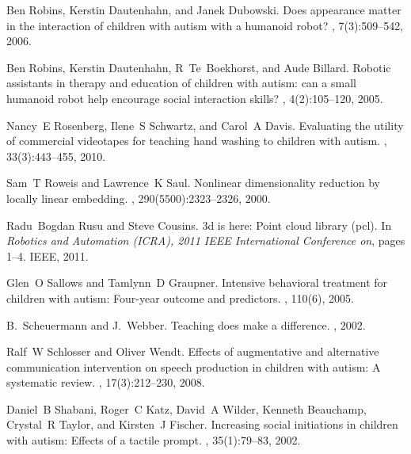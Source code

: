 \documentclass{ut-thesis}
\begin{document}
\begin{thebibliography}{100}
Ben Robins, Kerstin Dautenhahn, and Janek Dubowski.
\newblock Does appearance matter in the interaction of children with autism
  with a humanoid robot?
, 7(3):509--542, 2006.

Ben Robins, Kerstin Dautenhahn, R~Te~Boekhorst, and Aude Billard.
\newblock Robotic assistants in therapy and education of children with autism:
  can a small humanoid robot help encourage social interaction skills?
, 4(2):105--120,
  2005.

Nancy~E Rosenberg, Ilene~S Schwartz, and Carol~A Davis.
\newblock Evaluating the utility of commercial videotapes for teaching hand
  washing to children with autism.
, 33(3):443--455, 2010.

Sam~T Roweis and Lawrence~K Saul.
\newblock Nonlinear dimensionality reduction by locally linear embedding.
, 290(5500):2323--2326, 2000.

Radu~Bogdan Rusu and Steve Cousins.
\newblock 3d is here: Point cloud library (pcl).
\newblock In {\em Robotics and Automation (ICRA), 2011 IEEE International
  Conference on}, pages 1--4. IEEE, 2011.

Glen~O Sallows and Tamlynn~D Graupner.
\newblock Intensive behavioral treatment for children with autism: Four-year
  outcome and predictors.
, 110(6), 2005.

B.~Scheuermann and J.~Webber.
\newblock Teaching does make a difference.
, 2002.

Ralf~W Schlosser and Oliver Wendt.
\newblock Effects of augmentative and alternative communication intervention on
  speech production in children with autism: A systematic review.
, 17(3):212--230,
  2008.

Daniel~B Shabani, Roger~C Katz, David~A Wilder, Kenneth Beauchamp, Crystal~R
  Taylor, and Kirsten~J Fischer.
\newblock Increasing social initiations in children with autism: Effects of a
  tactile prompt.
, 35(1):79--83, 2002.


\end{thebibliography}
\end{document}
